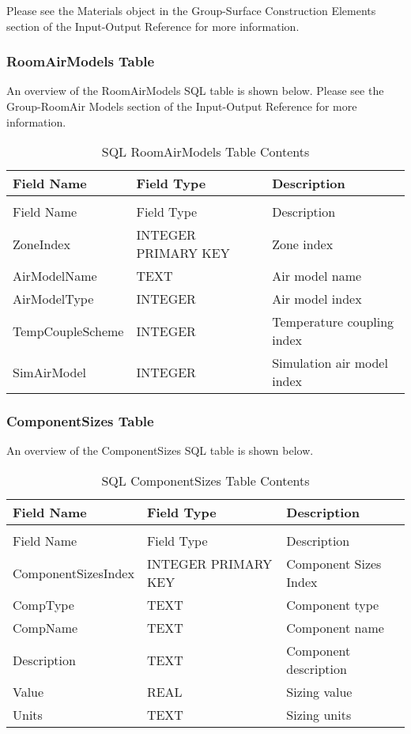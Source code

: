 Please see the Materials object in the Group-Surface Construction Elements section of the Input-Output Reference for more information.

\subsubsection{RoomAirModels Table}

An overview of the RoomAirModels SQL table is shown below. Please see the Group-RoomAir Models section of the Input-Output Reference for more information.

\begin{longtable}[c]{@{}lll@{}}
\caption{SQL RoomAirModels Table Contents \label{table:table-29.-sql-roomairmodels-table-contents}} \tabularnewline
\toprule 
Field Name & Field Type & Description \tabularnewline
\midrule
\endfirsthead

\caption[]{SQL RoomAirModels Table Contents} \tabularnewline
\toprule 
Field Name & Field Type & Description \tabularnewline
\midrule
\endhead

ZoneIndex & INTEGER PRIMARY KEY & Zone index \tabularnewline
AirModelName & TEXT & Air model name \tabularnewline
AirModelType & INTEGER & Air model index \tabularnewline
TempCouple\-Scheme & INTEGER & Temperature coupling index \tabularnewline
SimAirModel & INTEGER & Simulation air model index \tabularnewline
\bottomrule
\end{longtable}

\subsubsection{ComponentSizes Table}

An overview of the ComponentSizes SQL table is shown below.

\begin{longtable}[c]{@{}lll@{}}
\caption{SQL ComponentSizes Table Contents \label{table:table-30.-sql-componentsizes-table-contents}} \tabularnewline
\toprule 
Field Name & Field Type & Description \tabularnewline
\midrule
\endfirsthead

\caption[]{SQL ComponentSizes Table Contents} \tabularnewline
\toprule 
Field Name & Field Type & Description \tabularnewline
\midrule
\endhead

Component\-Sizes\-Index & INTEGER PRIMARY KEY & Component Sizes Index \tabularnewline
CompType & TEXT & Component type \tabularnewline
CompName & TEXT & Component name \tabularnewline
Description & TEXT & Component description \tabularnewline
Value & REAL & Sizing value \tabularnewline
Units & TEXT & Sizing units \tabularnewline
\bottomrule
\end{longtable}

